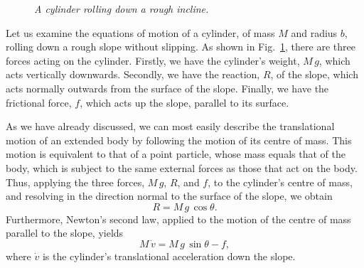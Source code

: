 \begin{figure}
\epsfysize=3in
\centerline{}
\caption{\em A cylinder rolling down a rough incline.}\label{f85}  
\end{figure}

Let us examine the equations of motion of a cylinder, of mass $M$ and radius $b$, rolling down a
rough slope without slipping. As shown in Fig.~\ref{f85}, there are three
forces acting on the cylinder. Firstly, we have the cylinder's weight, $M\,g$, which acts
vertically downwards. Secondly, we have the reaction, $R$, of the slope, which acts
normally outwards from the surface of the slope. Finally, we have the frictional force, $f$,
which acts up the slope, parallel to its surface.

As we have already discussed, we can most easily describe the translational
motion of an extended body by following the motion of its centre of mass.
This motion is equivalent to that of a point particle, whose mass equals that
of the body, which is subject to the same external forces as those that act
on the body. Thus, applying the three forces, $M\,g$, $R$, and $f$, to
the cylinder's centre of mass, and resolving in the direction normal to the surface of the
slope, we obtain
\begin{equation}
R = M\,g\,\cos\theta.
\end{equation}
Furthermore, Newton's second law,  applied to the motion of the centre of mass
parallel to the slope, yields
\begin{equation}\label{e8123}
M\,\dot{v} = M\,g\,\sin\theta - f,
\end{equation}
where $\dot{v}$ is the cylinder's translational acceleration down the slope.

